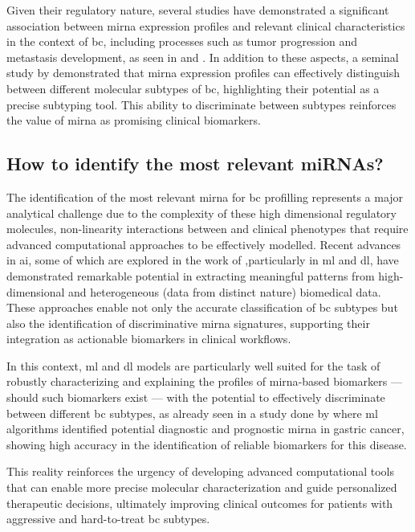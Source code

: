 Given their regulatory nature, several studies have demonstrated a significant
association between \gls{mirna} expression profiles and relevant clinical
characteristics in the context of \gls{bc}, including processes such as tumor
progression and metastasis development, as seen in
\textcite{_Mendes2022Nanodelivery} \textcite{mirna_as_biomarkers_Ho2022} and
\textcite{mirnas_in_bc_Muñoz2023}. In addition to these aspects, a seminal
study by \textcite{mirna_as_bio_for_sub_Blenkiron2007MicroRNA} demonstrated
that \gls{mirna} expression profiles can effectively distinguish between
different molecular subtypes of \gls{bc}, highlighting their potential as a
precise subtyping tool. This ability to discriminate between subtypes
reinforces the value of \gls{mirna} as promising clinical biomarkers.

\subsection{How to identify the most relevant miRNAs?}

The identification of the most relevant \gls{mirna} for \gls{bc} profilling
represents a major analytical challenge due to the complexity of these high
dimensional regulatory molecules, non-linearity interactions between and
clinical phenotypes that require advanced computational approaches to be
effectively modelled. Recent advances in \gls{ai}, some of which are explored
in the work of \textcite{ml_for_microRNA_Luo2023MachineLearning},particularly
in \gls{ml} and \gls{dl}, have demonstrated remarkable potential in extracting
meaningful patterns from high-dimensional and heterogeneous (data from distinct
nature) biomedical data. These approaches enable not only the accurate
classification of \gls{bc} subtypes but also the identification of
discriminative \gls{mirna} signatures, supporting their integration as
actionable biomarkers in clinical workflows.

In this context, \gls{ml} and \gls{dl} models are particularly well suited for
the task of robustly characterizing and explaining the profiles of
\gls{mirna}-based biomarkers — should such biomarkers exist — with the
potential to effectively discriminate between different \gls{bc} subtypes, as
already seen in a study done by \textcite{ml_gastric_Azari2023} where \gls{ml}
algorithms identified potential diagnostic and prognostic \gls{mirna} in
gastric cancer, showing high accuracy in the identification of reliable
biomarkers for this disease.

This reality reinforces the urgency of developing advanced computational tools
that can enable more precise molecular characterization and guide personalized
therapeutic decisions, ultimately improving clinical outcomes for patients with
aggressive and hard-to-treat \gls{bc} subtypes.

